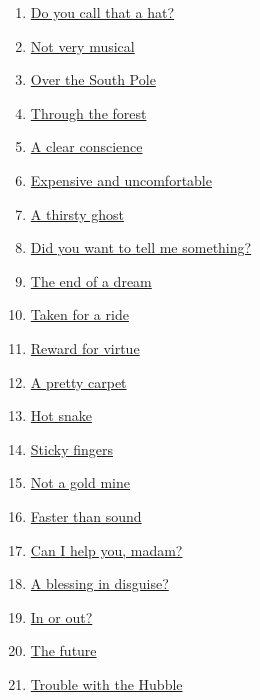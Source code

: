 \documentclass[11pt]{article}
\begin{document}
\begin{multicols}{2}
\begin{enumerate}
		\item \href{https://mp.weixin.qq.com/s/Bf73tYBmJOMDvCLOGfQleg}{Do you call that a hat?}	%
		\item \href{https://mp.weixin.qq.com/s/KR80K-7yL0yhWQ4yq5qDTA}{Not very musical}	%
		\item \href{https://mp.weixin.qq.com/s/lCVAPItpm_x_5U22hC93Iw}{Over the South Pole}	%
		\item \href{https://mp.weixin.qq.com/s/XO0M_5fYLtlxtlo2b_tnnQ}{Through the forest}	%
		\item \href{https://mp.weixin.qq.com/s/1kHNfAzlTuBRsg9cdRx94w}{A clear conscience}	%
		\item \href{https://mp.weixin.qq.com/s/yYGFKS0zaUv3Vx_r1opFjw}{Expensive and uncomfortable}	%
		\item \href{https://mp.weixin.qq.com/s/yxtOr19rQZ7DXpqRiqUj_w}{A thirsty ghost}	%
		\item \href{https://mp.weixin.qq.com/s/2R-HwdjjyCZFkhpZdcYg0A}{Did you want to tell me something?}	%
		\item \href{https://mp.weixin.qq.com/s/inS2KeXVwhcKOn5GIRnqGA}{The end of a dream}	%
		\item \href{https://mp.weixin.qq.com/s/x3fFa18Dv6zFKOTORE2yRQ}{Taken for a ride}	%
		\item \href{https://mp.weixin.qq.com/s/yY0rruW3uJ_zDHNhPuw91w}{Reward for virtue}	%
		\item \href{https://mp.weixin.qq.com/s/eYxSdN5Zat5RpWYLwH3NCA}{A pretty carpet}	%
		\item \href{https://mp.weixin.qq.com/s/2bky2EUAufsh_lHf9POQwg}{Hot snake}	%
		\item \href{https://mp.weixin.qq.com/s/7X2HIE8jwxx-NBuhnCkOJg}{Sticky fingers}	%
		\item \href{https://mp.weixin.qq.com/s/CFlzeik5KzUT9Tb-mQaGBg}{Not a gold mine}	%
		\item \href{https://mp.weixin.qq.com/s/G7dWQ0-Y7aPWoEBX94fccg}{Faster than sound}	%
		\item \href{https://mp.weixin.qq.com/s/nbBidDniUoj6jTD_1UURGg}{Can I help you, madam?}	%
		\item \href{https://mp.weixin.qq.com/s/FaMyahkX78rLjJq6Z0Dgvg}{A blessing in disguise?}	%
		\item \href{https://mp.weixin.qq.com/s/5Phe68AqUmwfPYIMbc0rWA}{In or out?}	%
		\item \href{https://mp.weixin.qq.com/s/EQkm9xw1fbdlMdK86pO9kA}{The future}	%
		\item \href{https://mp.weixin.qq.com/s/vWAHNcbUJOp5R8CxMPEq2w}{Trouble with the Hubble}	%

\end{enumerate}
\end{multicols}
\end{document}
